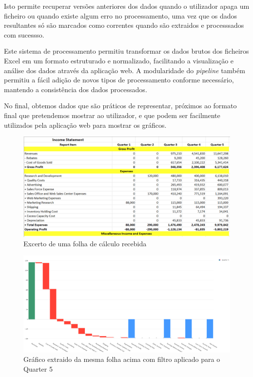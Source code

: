 Isto permite recuperar versões anteriores dos dados quando o utilizador apaga um ficheiro ou quando existe algum erro no processamento, uma vez que os dados resultantes só são marcados como correntes quando são extraidos e processsados com sucessso.

Este sistema de processamento permitiu transformar os dados brutos dos ficheiros Excel em um formato estruturado e normalizado, facilitando a visualização e análise dos dados através da aplicação web. A modularidade do \textit{pipeline} também permitiu a fácil adição de novos tipos de processamento conforme necessário, mantendo a consistência dos dados processados.

No final, obtemos dados que são práticos de representar, próximos ao formato final que pretendemos mostrar ao utilizador, e que podem ser facilmente utilizados pela aplicação web para mostrar os gráficos.

\begin{figure}[H]
\centering
\includegraphics[width=\textwidth]{./img/before}
\caption{Excerto de uma folha de cálculo recebida}
\end{figure}

\begin{figure}[H]
\centering
\includegraphics[width=\textwidth]{./img/after}
\caption{Gráfico extraido da mesma folha acima com filtro aplicado para o Quarter 5}
\end{figure}

